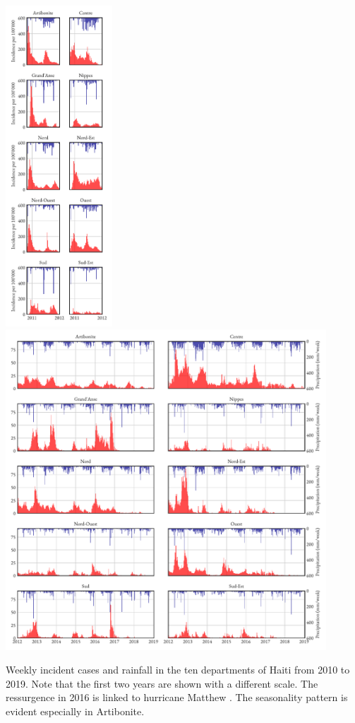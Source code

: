\begin{fwfigure}
	\centering
	\includegraphics[height=12cm,keepaspectratio]{fig_cholera-haiti-ocv/haiti-2010.pdf}
		\includegraphics[height=12cm,keepaspectratio]{fig_cholera-haiti-ocv/haiti-2012.pdf}
	\caption[Incident cholera cases and rainfall in Haiti from 2010 to 2019]{Weekly incident cases and rainfall in the ten departments of Haiti from 2010 to 2019. Note that the first two years are shown with a different scale. The ressurgence in 2016 is linked to hurricane Matthew \parencites{Pasetto:RealtimeForecastingCholera:2018,Khan:AssessmentRiskCholera:2017}. The seasonality pattern is evident especially in Artibonite.}
	\label{fig:data2}
\end{fwfigure}
